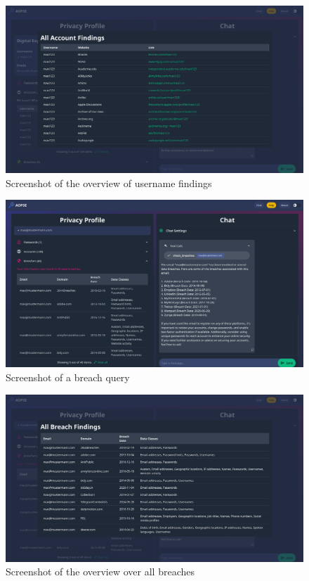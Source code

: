 \documentclass[
    a4paper,
    pagesize,
	pdftex,
    12pt,
]{scrartcl}
\begin{document}
\begin{figure}[H]
	\centering
	\includegraphics[width=15cm]{Frontend-findings-usernames.png}
	\caption{Screenshot of the overview of username findings}
	\label{fig:frondent-findings-username}
\end{figure}
\begin{figure}[H]
	\centering
	\includegraphics[width=15cm]{Frontend-breaches.png}
	\caption{Screenshot of a breach query}
	\label{fig:frondent-breaches}
\end{figure}
\begin{figure}[H]
	\centering
	\includegraphics[width=15cm]{Frontend-breaches-overview.png}
	\caption{Screenshot of the overview over all breaches}
	\label{fig:frondent-breaches-overview}
\end{figure}
\end{document}
